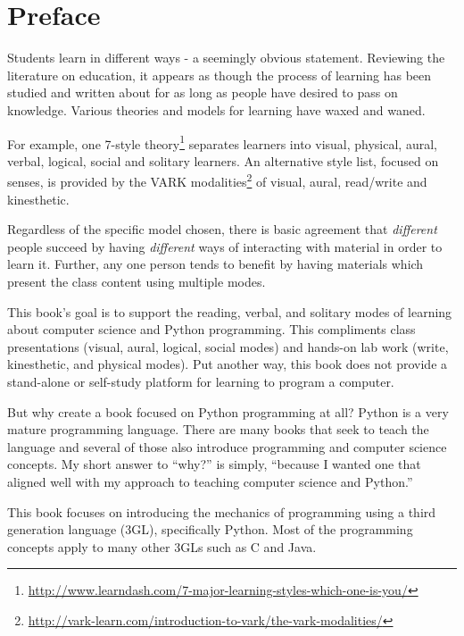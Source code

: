 
\chapter{Preface}

Students learn in different ways - a seemingly obvious statement. Reviewing the literature on education, it appears as though the process of learning has been studied and written about for as long as people have desired to pass on knowledge. Various theories and models for learning have waxed and waned.

For example, one 7-style theory\footnote{\url{http://www.learndash.com/7-major-learning-styles-which-one-is-you/}} separates learners into visual, physical, aural, verbal, logical, social and solitary learners. An alternative style list, focused on senses, is provided by the VARK modalities\footnote{\url{http://vark-learn.com/introduction-to-vark/the-vark-modalities/}} of visual, aural, read/write and kinesthetic.

Regardless of the specific model chosen, there is basic agreement that \textit{different} people succeed by having \textit{different} ways of interacting with material in order to learn it. Further, any one person tends to benefit by having materials which present the class content using multiple modes.

This book's goal is to support the reading, verbal, and solitary modes of learning about computer science and Python programming. This compliments class presentations (visual, aural, logical, social modes) and hands-on lab work (write, kinesthetic, and physical modes). Put another way, this book does not provide a stand-alone or self-study platform for learning to program a computer.

But why create a book focused on Python programming at all? Python is a very mature programming language. There are many books that seek to teach the language and several of those also introduce programming and computer science concepts. My short answer to ``why?'' is simply, ``because I wanted one that aligned well with my approach to teaching computer science and Python.''

This book focuses on introducing the mechanics of programming using a third generation language (3GL), specifically Python. Most of the programming concepts apply to many other 3GLs such as C and Java. 

